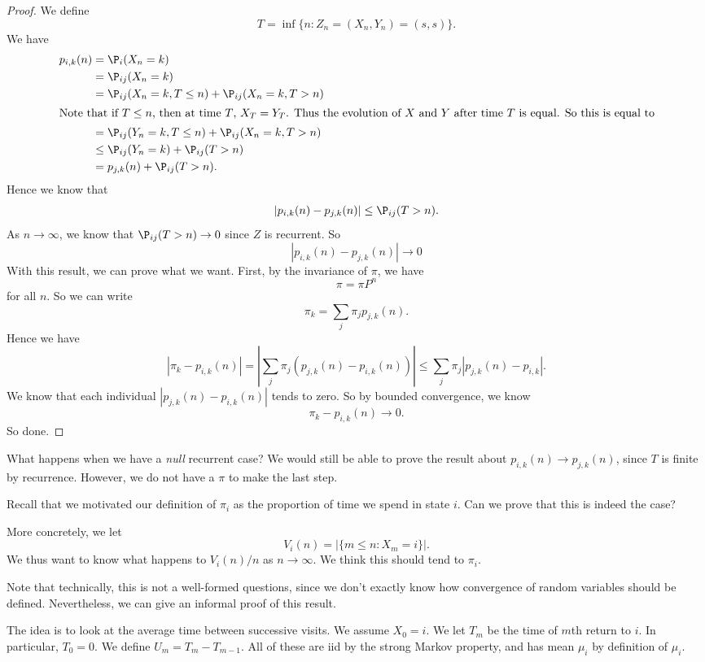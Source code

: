 \documentclass[a4paper]{article}
\begin{document}
\begin{proof}
  We define
  \[
    T = \inf\{n: Z_n = (X_n, Y_n) = (s, s)\}.
  \]
  We have
  \begin{align*}
    p_{i, k}(n) &= \P_i(X_n = k)\\
    &= \P_{ij}(X_n = k)\\
    &= \P_{ij} (X_n = k, T \leq n) + \P_{ij} (X_n = k, T > n)\\
    \intertext{Note that if $T \leq n$, then at time $T$, $X_T = Y_T$. Thus the evolution of $X$ and $Y$ after time $T$ is equal. So this is equal to}
    &= \P_{ij}(Y_n = k, T \leq n) + \P_{ij} (X_n = k, T > n)\\
    &\leq \P_{ij}(Y_n = k) + \P_{ij}(T > n)\\
    &= p_{j,k}(n) + \P_{ij}(T > n).
  \end{align*}
  Hence we know that
  \[
    |p_{i, k}(n) - p_{j, k}(n)| \leq \P_{ij} (T > n).
  \]
  As $n \to \infty$, we know that $\P_{ij}(T > n) \to 0$ since $Z$ is recurrent. So
  \[
    |p_{i, k}(n) - p_{j, k}(n)| \to 0
  \]
  With this result, we can prove what we want. First, by the invariance of $\pi$, we have
  \[
    \pi = \pi P^n
  \]
  for all $n$. So we can write
  \[
    \pi_k = \sum_j \pi_j p_{j, k}(n).
  \]
  Hence we have
  \[
    |\pi_k - p_{i, k}(n)| = \left|\sum_j \pi_j (p_{j, k}(n) - p_{i, k}(n))\right| \leq \sum_j \pi_j |p_{j, k}(n) - p_{i, k}|.
  \]
  We know that each individual $|p_{j, k}(n) - p_{i, k}(n)|$ tends to zero. So by bounded convergence, we know
  \[
    \pi_k - p_{i, k}(n) \to 0.
  \]
  So done.
\end{proof}
What happens when we have a \emph{null} recurrent case? We would still be able to prove the result about $p_{i, k}(n) \to p_{j, k}(n)$, since $T$ is finite by recurrence. However, we do not have a $\pi$ to make the last step.

Recall that we motivated our definition of $\pi_i$ as the proportion of time we spend in state $i$. Can we prove that this is indeed the case?

More concretely, we let
\[
  V_i(n) = |\{m \leq n: X_m = i\}|.
\]
We thus want to know what happens to $V_i(n)/n$ as $n \to \infty$. We think this should tend to $\pi_i$.

Note that technically, this is not a well-formed questions, since we don't exactly know how convergence of random variables should be defined. Nevertheless, we can give an informal proof of this result.

The idea is to look at the average time between successive visits. We assume $X_0 = i$. We let $T_m$ be the time of $m$th return to $i$. In particular, $T_0 = 0$. We define $U_m = T_m - T_{m - 1}$. All of these are iid by the strong Markov property, and has mean $\mu_i$ by definition of $\mu_i$.
\end{document}
